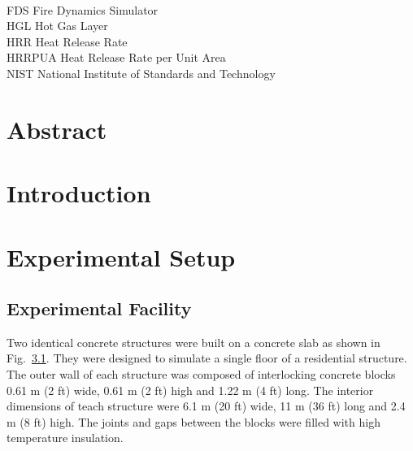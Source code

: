 \documentclass[12pt,oneside]{book}
\begin{document}
\begin{tabbing}
\hspace{1.5in} \= \\
FDS \> Fire Dynamics Simulator \\
HGL \> Hot Gas Layer \\
HRR \> Heat Release Rate \\
HRRPUA \> Heat Release Rate per Unit Area \\
NIST \> National Institute of Standards and Technology \\
\end{tabbing}
	
\mainmatter
	
\chapter{Abstract}
\label{chap:Abstract} 

\chapter{Introduction}
\label{chap:Introduction}

\chapter{Experimental Setup}
\label{chap:Experimental_Setup}

\section{Experimental Facility}
\label{sec:Experimental_Facility}

Two identical concrete structures were built on a concrete slab as shown in Fig.~\ref{sec:Experimental_Facility}. They were designed to simulate a single floor of a residential structure.  The outer wall of each structure was composed of interlocking concrete blocks 0.61 m (2 ft) wide, 0.61 m (2 ft) high and 1.22 m (4 ft) long.  The interior dimensions of teach structure were 6.1 m (20 ft) wide, 11 m (36 ft) long and 2.4 m (8 ft) high.  The joints and gaps between the blocks were filled with high temperature insulation.
\end{document}
